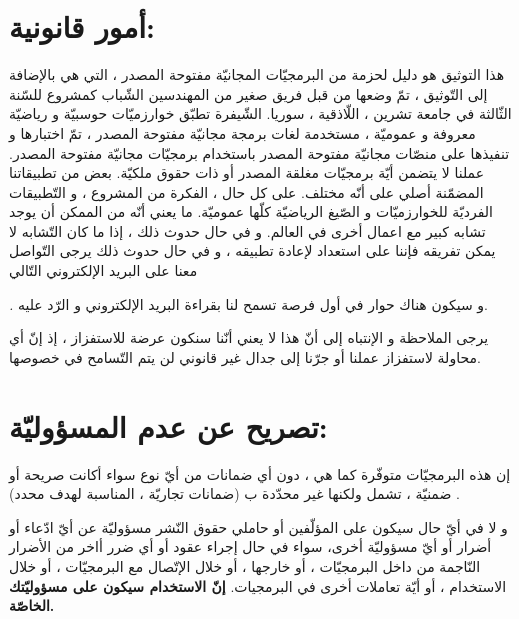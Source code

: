 \documentclass[11pt,a4paper]{report}
\begin{document}
\begin{otherlanguage}{arabic}
\section{أمور قانونية:}
\begin{otherlanguage}{arabic}
\begin{center}
هذا التوثيق هو دليل لحزمة من البرمجيّات المجانيّة  مفتوحة المصدر ، التي هي بالإضافة إلى التّوثيق ، تمّ وضعها من قبل فريق صغير من المهندسين الشّباب كمشروع للسّنة الثّالثة
في جامعة تشرين ، اللّاذقية ، سوريا.
\newpage
الشّيفرة تطبّق خوارزميّات حوسبيّة و رياضيّة معروفة و عموميّة ، مستخدمة لغات برمجة مجانيّة  مفتوحة المصدر ، تمّ اختبارها و تنفيذها على منصّات مجانيّة مفتوحة المصدر 
باستخدام برمجيّات مجانيّة مفتوحة المصدر.
\newline
عملنا لا يتضمن أيّة برمجيّات مغلقة المصدر أو ذات حقوق ملكيّة.
\newline
بعض من تطبيقاتنا المضمّنة أصلي على أنّه مختلف.
\newline
على كل حال ، الفكرة من المشروع ، و التّطبيقات الفرديّة للخوارزميّات و الصّيغ الرياضيّة كلّها عموميّة.
\newline
ما يعني أنّه من الممكن أن يوجد تشابه كبير مع اعمال أخرى في العالم.
\newline
و في حال حدوث ذلك ، إذا ما كان التّشابه ﻻ يمكن تفريقه فإننا على استعداد لإعادة تطبيقه ، و في حال حدوث ذلك يرجى التّواصل معنا على البريد الإلكتروني التّالي

\textit{.}
\newline
و سيكون هناك حوار  في أول فرصة  تسمح لنا بقراءة البريد الإلكتروني و الرّد عليه.

يرجى الملاحظة و الإنتباه إلى أنّ هذا لا يعني أنّنا سنكون عرضة للاستفزاز ، إذ إنّ أي محاولة لاستفزاز عملنا أو جرّنا إلى جدال غير قانوني لن يتم التّسامح في خصوصها.
\end{center}
\end{otherlanguage}



\section{تصريح عن عدم المسؤوليّة:}
\begin{otherlanguage}{arabic}
\begin{center}
إن  هذه البرمجيّات متوفّرة كما هي ، دون أي ضمانات من أيّ نوع سواء أكانت صريحة أو ضمنيّة ،  تشمل ولكنها غير محدّدة ب (ضمانات تجاريّة ، المناسبة لهدف محدد) .
\newline

و لا في أيّ حال سيكون على المؤلّفين أو حاملي حقوق النّشر مسؤوليّة عن أيّ ادّعاء أو أضرار أو أيّ مسؤوليّة أخرى،
\newline
سواء في حال إجراء عقود أو أي ضرر أاخر من الأضرار النّاجمة من داخل البرمجيّات ، أو خارجها ، أو خلال الإتّصال مع البرمجيّات ، أو خلال الاستخدام ، أو أيّة تعاملات أخرى في البرمجيات.
\newline
\textbf{إنّ الاستخدام سيكون على مسؤوليّتك الخاصّة.}
\\
\\



\end{center}
\end{otherlanguage}
\end{otherlanguage}
\end{document}
